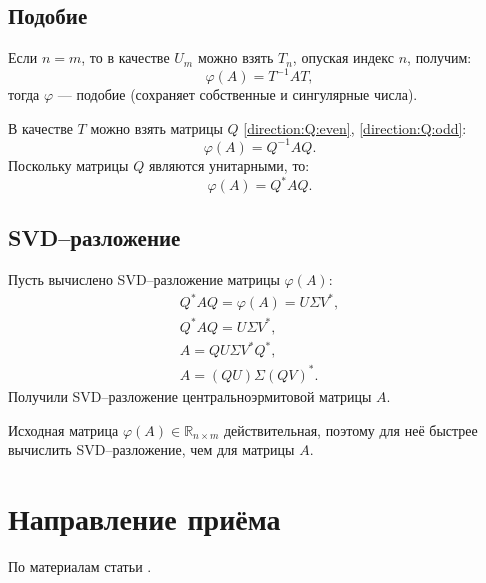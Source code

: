 \subsection{Подобие}

Если $n = m$, то в качестве $U_m$ можно взять $T_n$, опуская индекс $n$, получим:
\[
    \varphi(A) = T^{-1} A T ,
\]
тогда $\varphi$ --- подобие (сохраняет собственные и сингулярные числа).

В качестве $T$ можно взять матрицы $Q$ \eqref{direction:Q:even}, \eqref{direction:Q:odd}:
\[
    \varphi(A) = Q^{-1} A Q .
\]
Поскольку матрицы $Q$ являются унитарными, то:
\[
    \varphi(A) = Q^* A Q .
\]

\subsection{SVD--разложение}

Пусть вычислено SVD--разложение матрицы $\varphi(A)$:
\begin{gather*}
    Q^* A Q = \varphi(A) = U \Sigma V^* , \\
    Q^* A Q = U \Sigma V^* , \\
    A = Q U \Sigma V^* Q^* , \\
    A = \left( Q U \right ) \Sigma \left( Q V \right)^* .
\end{gather*}
Получили SVD--разложение центральноэрмитовой матрицы $A$.

Исходная матрица $\varphi(A) \in \mathbb{R}_{n \times m}$ действительная, поэтому для неё быстрее вычислить SVD--разложение, чем для матрицы $A$.

\section{Направление приёма}

По материалам статьи \cite{Cao_Liu}.

